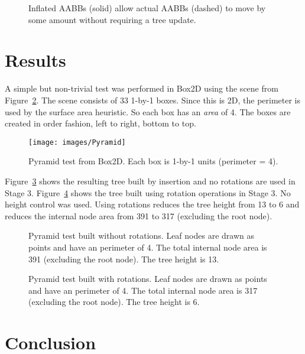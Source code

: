 \documentclass{article}
\begin{document}
\begin{figure}
	\begin{center}
		
	\end{center}
	\caption{Inflated AABBs (solid) allow actual AABBs (dashed) to move by some amount without requiring a tree update. }
	\label{fig:inflated}
\end{figure}

\section{Results}

A simple but non-trivial test was performed in Box2D using the scene from Figure~\ref{fig:pyramid}. The scene consists of 33 1-by-1 boxes. Since this is 2D, the perimeter is used by the surface area heuristic. So each box has an \emph{area} of 4. The boxes are created in order fashion, left to right, bottom to top.

\begin{figure}
	\begin{center}
		\texttt{[image: images/Pyramid]}
	\end{center}
	\caption{ Pyramid test from Box2D. Each box is 1-by-1 units (perimeter = 4).}
	\label{fig:pyramid}
\end{figure}

Figure~\ref{fig:pyramid_base} shows the resulting tree built by insertion and no rotations are used in Stage 3. Figure~\ref{fig:pyramid_rotate} shows the tree built using rotation operations in Stage 3. No height control was used. Using rotations reduces the tree height from 13 to 6 and reduces the internal node area from 391 to 317 (excluding the root node).

\begin{figure}
	\begin{center}
		
	\end{center}
	\caption{ Pyramid test built without rotations. Leaf nodes are drawn as points and have an perimeter of 4. The total internal node area is 391 (excluding the root node). The tree height is 13. }
	\label{fig:pyramid_base}
\end{figure}

\begin{figure}
	\begin{center}
		
	\end{center}
	\caption{ Pyramid test built with rotations. Leaf nodes are drawn as points and have an perimeter of 4. The total internal node area is 317 (excluding the root node). The tree height is 6. }
	\label{fig:pyramid_rotate}
\end{figure}

\section{Conclusion}



\end{document}
